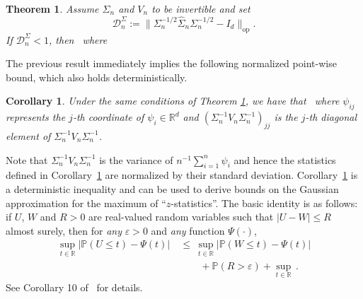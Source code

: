 \documentclass{article}
\newtheorem{theorem}{Theorem}
\newtheorem{corollary}{Corollary}
\begin{document}
 
 
 
 
 
 
 
 
 
 
 
 
 
 
 
 
 \begin{theorem}\label{thm:Basic-deter-ineq}
 Assume $\Sigma_n$ and $V_n$ to be invertible and set 
 \begin{equation}\label{eq:Dn}
 \mathcal{D}_n^{\Sigma} := \|\Sigma_n^{-1/2}\widehat{\Sigma}_n\Sigma_n^{-1/2} - I_d\|_{\mathrm{op}}.
 \end{equation}
  If $\mathcal{D}_n^{\Sigma} < 1$, then 
 \
 where 
 \
 
 
 
 
 \end{theorem}
 
 
 
 
 The previous  result immediately implies the following normalized point-wise bound, which also holds deterministically.
 
 \begin{corollary}\label{cor:Max-Statistic-Correct-Scaling}
 Under the same conditions of Theorem \ref{thm:Basic-deter-ineq}, we have that 
 \
 where $\psi_{ij}$ represents the $j$-th coordinate of $\psi_i\in\mathbb{R}^d$ and $(\Sigma_n^{-1}V_n\Sigma_n^{-1})_{jj}$ is the $j$-th diagonal element of $\Sigma_n^{-1}V_n\Sigma_n^{-1}$.
 \end{corollary}
 
 Note that $\Sigma_n^{-1}V_n\Sigma_n^{-1}$ is the variance of $n^{-1}\sum_{i=1}^n \psi_i$ and hence the statistics defined in Corollary~\ref{cor:Max-Statistic-Correct-Scaling} are normalized by their standard deviation. Corollary~\ref{cor:Max-Statistic-Correct-Scaling} is a deterministic inequality and can be used to derive bounds on the Gaussian approximation for the maximum of ``$z$-statistics''. The basic identity is as follows: if $U$, $W$ and $R > 0$ are real-valued random variables such that $|U - W| \le R$ almost surely, then for \emph{any} $\varepsilon > 0$ and \emph{any} function $\Psi(\cdot)$,
 \begin{equation}\label{eq:basic-identity-BE}
 \begin{split}
 \sup_{t\in\mathbb{R}}|\mathbb{P}(U \le t) - \Psi(t)| ~&\le~ \sup_{t\in\mathbb{R}}|\mathbb{P}(W \le t) - \Psi(t)|\\ 
 &\qquad+ \mathbb{P}(R > \varepsilon) + \sup_{t\in\mathbb{R}}\,.
 \end{split}
 \end{equation}
 See Corollary 10 of~\cite{paulauskas1996rates} for details.
 
\end{document}
